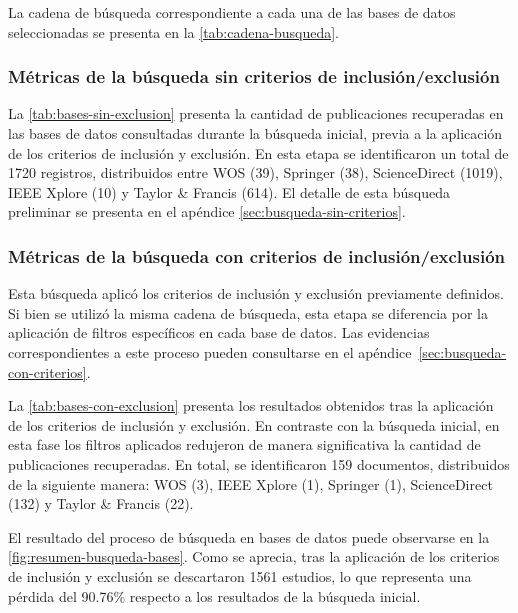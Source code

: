 La cadena de búsqueda correspondiente a cada una de las bases de datos seleccionadas se presenta en la \autoref{tab:cadena-busqueda}.




\subsubsection{Métricas de la búsqueda sin criterios de inclusión/exclusión}\label{subsubsec:resumen-busqueda}

La \autoref{tab:bases-sin-exclusion} presenta la cantidad de publicaciones recuperadas en las bases de datos consultadas durante la búsqueda inicial, previa a la aplicación de los criterios de inclusión y exclusión. En esta etapa se identificaron un total de 1720 registros, distribuidos entre \ac{WOS} (39), Springer (38), ScienceDirect (1019), IEEE Xplore (10) y Taylor \& Francis (614). El detalle de esta búsqueda preliminar se presenta en el apéndice \ref{sec:busqueda-sin-criterios}.




\subsubsection{Métricas de la búsqueda con criterios de inclusión/exclusión}\label{subsec:resumen-busqueda-citerios}

Esta búsqueda aplicó los criterios de inclusión y exclusión previamente definidos. Si bien se utilizó la misma cadena de búsqueda, esta etapa se diferencia por la aplicación de filtros específicos en cada base de datos. Las evidencias correspondientes a este proceso pueden consultarse en el apéndice~\ref{sec:busqueda-con-criterios}.

La \autoref{tab:bases-con-exclusion} presenta los resultados obtenidos tras la aplicación de los criterios de inclusión y exclusión. En contraste con la búsqueda inicial, en esta fase los filtros aplicados redujeron de manera significativa la cantidad de publicaciones recuperadas. En total, se identificaron 159 documentos, distribuidos de la siguiente manera: \ac{WOS} (3), IEEE Xplore (1), Springer (1), ScienceDirect (132) y Taylor \& Francis (22).



El resultado del proceso de búsqueda en bases de datos puede observarse en la \autoref{fig:resumen-busqueda-bases}. Como se aprecia, tras la aplicación de los criterios de inclusión y exclusión se descartaron 1561 estudios, lo que representa una pérdida del 90.76\% respecto a los resultados de la búsqueda inicial.

